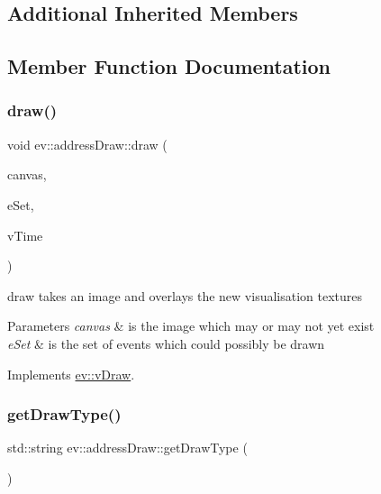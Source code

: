 \subsection*{Additional Inherited Members}


\subsection{Member Function Documentation}
\mbox{\label{classev_1_1addressDraw_a9ff5e558766f8b6cec2b11a60907b455}} 
\subsubsection{\texorpdfstring{draw()}{draw()}}
{\footnotesize\ttfamily void ev\+::address\+Draw\+::draw (\begin{DoxyParamCaption}\item[{cv\+::\+Mat \&}]{canvas,  }\item[{const ev\+::v\+Queue \&}]{e\+Set,  }\item[{int}]{v\+Time }\end{DoxyParamCaption})\hspace{0.3cm}{\ttfamily [virtual]}}



draw takes an image and overlays the new visualisation textures 


\begin{DoxyParams}{Parameters}
{\em canvas} & is the image which may or may not yet exist \\
\hline
{\em e\+Set} & is the set of events which could possibly be drawn \\
\hline
\end{DoxyParams}


Implements \hyperlink{classev_1_1vDraw_af1eee5dcdf3b4cfee6a3024e5cd706f8}{ev\+::v\+Draw}.

\mbox{\label{classev_1_1addressDraw_a92e98d08d1fdbf47d7e0cb9fcf7a9937}} 
\subsubsection{\texorpdfstring{get\+Draw\+Type()}{getDrawType()}}
{\footnotesize\ttfamily std\+::string ev\+::address\+Draw\+::get\+Draw\+Type (\begin{DoxyParamCaption}{ }\end{DoxyParamCaption})\hspace{0.3cm}{\ttfamily [virtual]}}



